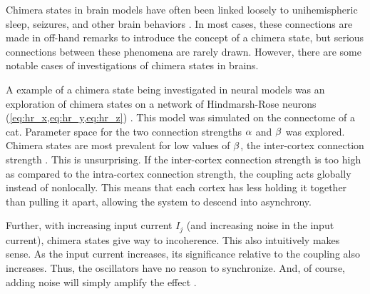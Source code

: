 Chimera states in brain models have often been linked loosely to
unihemispheric sleep,
seizures,
and other brain behaviors \cite{Abrams2008,Panaggio2015,Martens2013,Abrams2004,Shanahan2010,Hohlein2019,Bansal2019,Chouzouris2018}.
In most cases,
these connections are made in off-hand remarks to introduce the concept of a chimera state,
but serious connections between these phenomena are rarely drawn.
However,
there are some notable cases of investigations of chimera states in brains.

A example of a chimera state being investigated in neural models was an exploration of chimera states on a network of Hindmarsh-Rose neurons (\cref{eq:hr_x,eq:hr_y,eq:hr_z}) \cite{Santos2017}.
This model was simulated on the connectome of a cat.
Parameter space for the two connection strengths $\alpha$ and $\beta$ was explored.
Chimera states are most prevalent for low values of $\beta$, the inter-cortex connection strength \cite{Santos2017}.
This is unsurprising.
If the inter-cortex connection strength is too high as compared to the intra-cortex connection strength, the coupling acts globally instead of nonlocally.
This means that each cortex has less holding it together than pulling it apart, allowing the system to descend into asynchrony.

Further, with increasing input current $I_{j}$ (and increasing noise in the input current), chimera states give way to incoherence.
This also intuitively makes sense.
As the input current increases, its significance relative to the coupling also increases.
Thus, the oscillators have no reason to synchronize.
And, of course, adding noise will simply amplify the effect \cite{Santos2017}.

